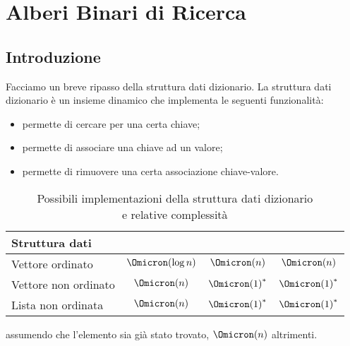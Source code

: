 
\ifsubfile
\pagestyle{plain}
\setcounter{chapter}{5}


\fi
\chapter{Alberi Binari di Ricerca}

\section{Introduzione}

Facciamo un breve ripasso della struttura dati dizionario.
La struttura dati dizionario è un insieme dinamico che implementa le seguenti funzionalità:
\begin{itemize}
	\item \Item {} permette di cercare per una certa chiave;
	\item {} permette di associare una chiave ad un valore;
	\item {} permette di rimuovere una certa associazione chiave-valore.
\end{itemize}

\begin{table}[H]
	\centering
	\caption{Possibili implementazioni della struttura dati dizionario\\e relative complessità}
	\label{tab:complessita-implementazioni-dizionario}
	\begin{tabular}{@{} l *{3}{c} @{}}
	\toprule
		Struttura dati & \dictLookup & \dictInsert & \dictRemove\\
	\midrule
	Vettore ordinato & \(\Omicron(\log n)\) & \(\Omicron(n)\) & \(\Omicron(n)\)\\
	Vettore non ordinato & \(\Omicron(n)\) & \({\Omicron(1)}^{*}\) & \({\Omicron(1)}^{*}\)\\
	Lista non ordinata & \(\Omicron(n)\) & \({\Omicron(1)}^{*}\) & \({\Omicron(1)}^{*}\)\\
	\bottomrule
	\end{tabular}

	\smallskip
	{\small	* assumendo che l'elemento sia già stato trovato, \(\Omicron(n)\) altrimenti.}
\end{table}

